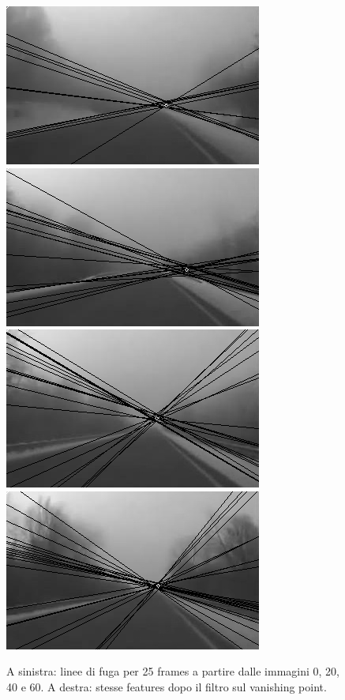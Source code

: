 \documentclass[12pt]{report}
\begin{document}
\begin{figure}
\begin{minipage}[c]{0.5\linewidth}
	\includegraphics[scale=\imTrackScale]{images/aF_0000_25.png}
	\includegraphics[scale=\imTrackScale]{images/aF_0020_25.png}
	\includegraphics[scale=\imTrackScale]{images/aF_0040_25.png}
	\includegraphics[scale=\imTrackScale]{images/aF_0060_25.png}
\end{minipage}
\caption[short]{A sinistra: linee di fuga per 25 frames a partire dalle immagini 0, 20, 40 e 60. A destra: stesse features dopo il filtro sul vanishing point.}
\label{fig:vp25}
\end{figure}
\end{document}
